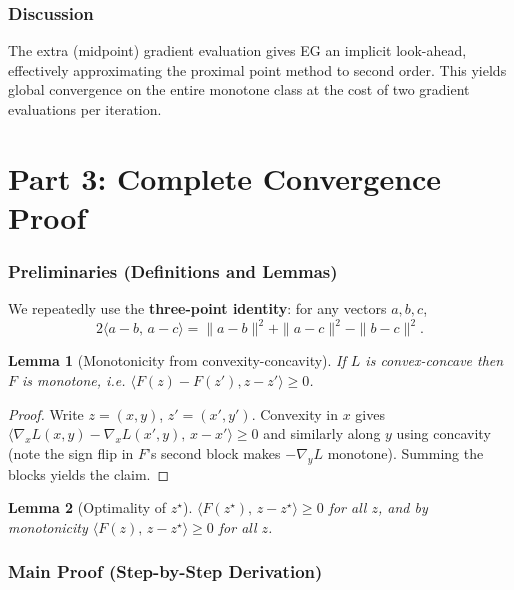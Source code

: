 \documentclass{article}
\newtheorem{lemma}{Lemma}
\begin{document}
\section*{Discussion}
The extra (midpoint) gradient evaluation gives EG an implicit
look-ahead, effectively approximating the proximal point method to second
order. This yields global convergence on the entire monotone class at the
cost of two gradient evaluations per iteration.

\part*{Part 3: Complete Convergence Proof}

\section*{Preliminaries (Definitions and Lemmas)}

We repeatedly use the \textbf{three-point identity}: for any vectors $a,b,c$,
\begin{equation}
\label{eq:3pt}
2\langle a-b,\, a-c\rangle = \|a-b\|^2 + \|a-c\|^2 - \|b-c\|^2.
\end{equation}

\begin{lemma}[Monotonicity from convexity-concavity]
\label{lem:mono}
If $L$ is convex-concave then $F$ is monotone, i.e.
$\langle F(z)-F(z'), z-z'\rangle \ge 0$.
\end{lemma}
\begin{proof}
Write $z=(x,y)$, $z'=(x',y')$. Convexity in $x$ gives
$\langle \nabla_x L(x,y)-\nabla_x L(x',y),\, x-x'\rangle\ge0$ and similarly
along $y$ using concavity (note the sign flip in $F$'s second block makes
$-\nabla_y L$ monotone). Summing the blocks yields the claim.
\end{proof}

\begin{lemma}[Optimality of $z^\star$]
\label{lem:opt}
$\langle F(z^\star),\, z-z^\star\rangle \ge 0$ for all $z$, and by
monotonicity $\langle F(z),\, z-z^\star\rangle \ge 0$ for all $z$.
\end{lemma}

\section*{Main Proof (Step-by-Step Derivation)}
\end{document}
